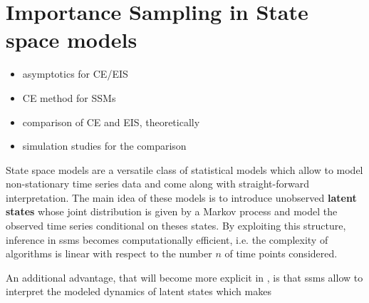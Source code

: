 \glsresetall
\newcommand{\ce}{{\ensuremath{\text{CE}}}}
\newcommand{\pce}{{\ensuremath{\psi_{\text{CE}}}}}
\newcommand{\hpce}{{\ensuremath{\hat\psi_{\text{CE}}}}}

\newcommand{\eis}{{\ensuremath{\text{EIS}}}}
\newcommand{\peis}{{\ensuremath{\psi_{\text{EIS}}}}}
\newcommand{\hpeis}{{\ensuremath{\hat\psi_{\text{EIS}}}}}

\newcommand{\la}{{\ensuremath{\text{LA}}}}

\newcommand{\Dto}{\stackrel{\mathcal D}{\to}}
\newcommand{\id}{\operatorname{id}}


\newcommand{\nbinom}{\operatorname{NegBinom}}

\chapter{Importance Sampling in State space models}
\label{cha:state_space_models}
\begin{tcolorbox}[title={Contributions of this chapter}]
    \begin{itemize}
        \item asymptotics for CE/EIS
        \item CE method for SSMs
        \item comparison of CE and EIS, theoretically
        \item simulation studies for the comparison
    \end{itemize}
\end{tcolorbox}
\newpage

State space models are a versatile class of statistical models which allow to model non-stationary time series data and come along with straight-forward interpretation.
The main idea of these models is to introduce unobserved \textbf{latent states} whose joint distribution is given by a Markov process and model the observed time series conditional on theses states.
By exploiting this structure, inference in \glspl{ssm} becomes computationally efficient, i.e. the complexity of algorithms is linear with respect to the number $n$ of time points considered.

An additional advantage, that will become more explicit in , is that \glspl{ssm} allow to interpret the modeled dynamics of latent states which makes


